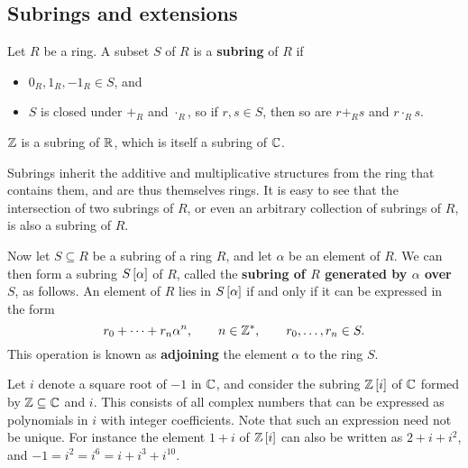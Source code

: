 \pagebreak

\subsection{Subrings and extensions}

\begin{definition}
Let $ R $ be a ring. A subset $ S $ of $ R $ is a \textbf{subring} of $ R $ if
\begin{itemize}
\item $ 0_R, 1_R, -1_R \in S $, and
\item $ S $ is closed under $ +_R $ and $ \cdot_R $, so if $ r, s \in S $, then so are $ r +_R s $ and $ r \cdot_R s $.
\end{itemize}
\end{definition}

\begin{example*}
$ \mathbb{Z} $ is a subring of $ \mathbb{R} $, which is itself a subring of $ \mathbb{C} $.
\end{example*}

Subrings inherit the additive and multiplicative structures from the ring that contains them, and are thus themselves rings. It is easy to see that the intersection of two subrings of $ R $, or even an arbitrary collection of subrings of $ R $, is also a subring of $ R $.

\begin{definition}
Now let $ S \subseteq R $ be a subring of a ring $ R $, and let $ \alpha $ be an element of $ R $. We can then form a subring $ S\sbr{\alpha} $ of $ R $, called the \textbf{subring of $ R $ generated by $ \alpha $ over $ S $}, as follows. An element of $ R $ lies in $ S\sbr{\alpha} $ if and only if it can be expressed in the form
$$ r_0 + \dots + r_n\alpha^n, \qquad n \in \mathbb{Z}^*, \qquad r_0, \dots, r_n \in S. $$
This operation is known as \textbf{adjoining} the element $ \alpha $ to the ring $ S $.
\end{definition}

\begin{example*}
Let $ i $ denote a square root of $ -1 $ in $ \mathbb{C} $, and consider the subring $ \Z\sbr{i} $ of $ \mathbb{C} $ formed by $ \mathbb{Z} \subseteq \mathbb{C} $ and $ i $. This consists of all complex numbers that can be expressed as polynomials in $ i $ with integer coefficients. Note that such an expression need not be unique. For instance the element $ 1 + i $ of $ \Z\sbr{i} $ can also be written as $ 2 + i + i^2 $, and $ -1 = i^2 = i^6 = i + i^3 + i^{10} $.
\end{example*}

